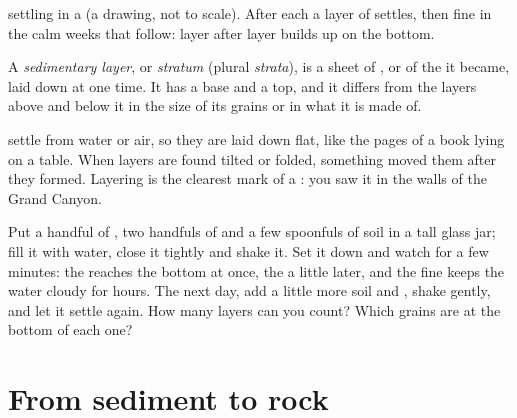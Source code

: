 \begin{omfigure}
{\small {} settling in a  (a drawing, not to scale). After each
 a layer of  settles, then fine  in the calm weeks that
follow: layer after layer builds up on the bottom.}
\label{fig:g7:sediments-and-fossils:lake}
\end{omfigure}

\begin{definition}\label{def:g7:sediments-and-fossils:layer}
A \emph{sedimentary layer}, or
\emph{stratum} (plural \emph{strata}), is a sheet of
, or of the  it became, laid down at one time. It has a base
and a top, and it differs from the layers above and below it in the size
of its grains or in what it is made of.
\end{definition}

 settle from water or air, so they are laid down flat, like
the pages of a book lying on a table. When layers are found tilted or
folded, something moved them after they formed. Layering is the clearest
mark of a : you saw it in the walls of the Grand Canyon.

\begin{inthelab}
Put a handful of , two handfuls of  and a few spoonfuls of soil
in a tall glass jar; fill it with water, close it tightly and shake it.
Set it down and watch for a few minutes: the  reaches the bottom at
once, the  a little later, and the fine  keeps the water cloudy
for hours. The next day, add a little more soil and , shake gently,
and let it settle again. How many layers can you count? Which grains are
at the bottom of each one?
\end{inthelab}

\section{From sediment to rock}

